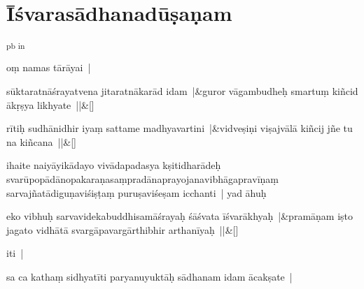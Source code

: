 \documentclass[article,12pt,a4paper]{memoir}%
\newcounter{parCount}
\begin{document}
	    
	    \endnumbering%
	    \endgroup
	    
	  
	  
	
	    
	    \begingroup
	    \beginnumbering%
	    
	  
\chapter*[{Īśvarasādhanadūṣaṇam}]{Īśvarasādhanadūṣaṇam}\label{īśvarasādhanadūṣaṇam}\textsuperscript{\textenglish{pb in}}\label{RNAms_18b}

	  \pstart \leavevmode%
	 \label{thakur75-32.4} oṃ namas tārāyai |
	{}
	\pend%
      
	    
	    \stanza[\smallbreak]
	  \label{thakur75-32.5}sūktaratnāśrayatvena jitaratnākarād idam |&guror vāgambudheḥ smartuṃ kiñcid ākṛṣya likhyate ||\&[\smallbreak]
	  
	  
	  
	    
	    \stanza[\smallbreak]
	  rītiḥ sudhānidhir iyaṃ sattame madhyavartini |&vidveṣiṇi viṣajvālā kiñcij jñe tu na kiñcana ||\&[\smallbreak]
	  
	  
	  

	  \pstart \leavevmode%
	\label{thakur75-32.9}ihaite naiyāyikādayo vivādapadasya kṣitidharādeḥ svarūpopādānopakaraṇasaṃpradānaprayojanavibhāgapravīṇaṃ sarvajñatādiguṇaviśiṣṭaṃ puruṣaviśeṣam icchanti | yad āhuḥ
	{}
	\pend%
      
	    
	    \stanza[\smallbreak]
	  \label{ratnakīrtinibandhāvali__īśvarakārikā}eko vibhuḥ sarvavidekabuddhisamāśrayaḥ śāśvata īśvarākhyaḥ |&pramāṇam iṣto jagato vidhātā svargāpavargārthibhir arthanīyaḥ ||\&[\smallbreak]
	  
	  
	  

	  \pstart \leavevmode%
	iti |
	{}
	\pend%
      

	  \pstart \leavevmode%
	\label{ratnakīrtinibandhāvali__36r1N6ICN8QWWKYUSP48U6N2TBT}sa ca kathaṃ sidhyatīti paryanuyuktāḥ sādhanam idam ācakṣate |
	{}
	\pend%
      
\end{document}
